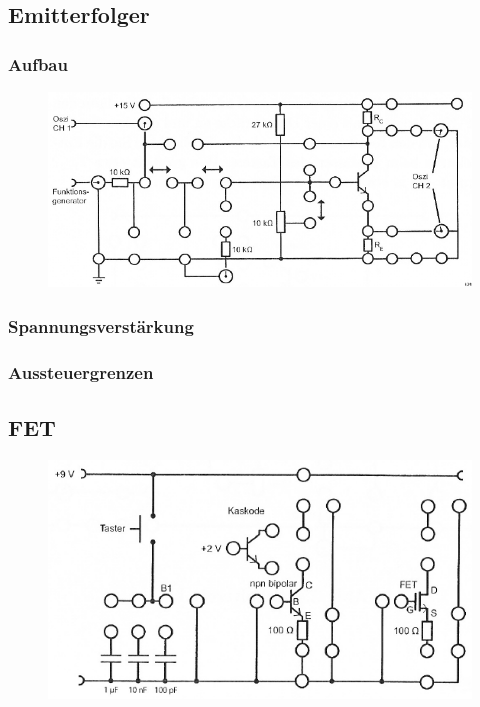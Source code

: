 \fehlt

\subsection{Emitterfolger}

\subsubsection{Aufbau}

\fehlt

\begin{figure}[htbp]
	\centering
	\includegraphics[width=\textwidth]{Anleitung/3-4.png}
	\caption{
		\cite[Abbildung~3.4]{physik313-Anleitung}
	}
	\label{fig:3-4}
\end{figure}

\subsubsection{Spannungsverstärkung}

\fehlt

\subsubsection{Aussteuergrenzen}

\fehlt

\subsection{FET}

\begin{figure}[htbp]
	\centering
	\includegraphics[width=\textwidth]{Anleitung/3-5.png}
	\caption{
		\cite[Abbildung~3.5]{physik313-Anleitung}
	}
	\label{fig:3-5}
\end{figure}

